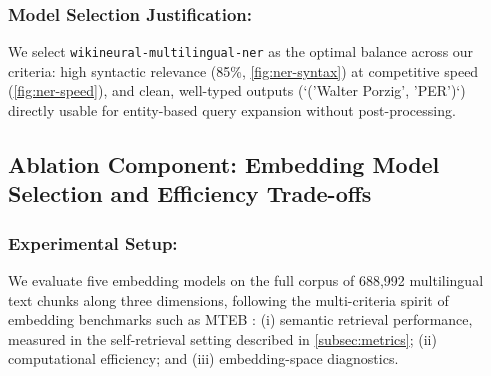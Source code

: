 \documentclass[11pt]{article}
\begin{document}
\subsubsection{Model Selection Justification:} We select \texttt{wikineural-multilingual-ner} as the optimal balance across our criteria: high syntactic relevance (85\%, \cref{fig:ner-syntax}) at competitive speed (\cref{fig:ner-speed}), and clean, well-typed outputs (`('Walter Porzig', 'PER')`) directly usable for entity-based query expansion without post-processing.

\subsection{Ablation Component: Embedding Model Selection and Efficiency Trade-offs}
\label{subsec:exp_embedding}

\subsubsection{Experimental Setup:} We evaluate five embedding models on the full corpus of 688,992 multilingual text chunks along three dimensions, following the multi-criteria spirit of embedding benchmarks such as MTEB \citep{muennighoff2023mteb}: (i) semantic retrieval performance, measured in the self-retrieval setting described in \cref{subsec:metrics}; (ii) computational efficiency; and (iii) embedding-space diagnostics.

\begin{table}[t]
    \centering
    \caption{Comprehensive evaluation of embedding models (self-retrieval protocol; \texttt{multilingual-e5-large} denotes \texttt{intfloat/multilingual-e5-large-instruct}).}
    \label{tab:embedding-comprehensive}
\end{table}
\end{document}
